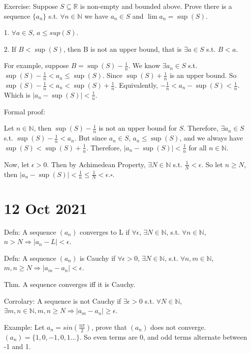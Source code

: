 \documentclass{report}
\begin{document}
Exercise: Suppose $S \subseteq \mathbb{R}$ is non-empty and bounded above. Prove there is a sequence $\{a_n\}$ s.t. $\forall n \in \mathbb{N}$ we have $a_n \in S$ and $\lim a_n =\sup(S)$. 

1. $\forall a \in S$, $a \leq sup(S)$. 

2. If $B < \sup(S)$, then B is not an upper bound, that is $\exists a \in S$ s.t. $B < a$. 

For example, suppose $B = \sup(S) - \frac{1}{n}$. 
We know $\exists a_n \in S$ s.t. $\sup(S) - \frac{1}{n} < a_n \leq \sup(S)$. 
Since $\sup(S) + \frac{1}{n}$ is an upper bound. 
So $\sup(S) - \frac{1}{n} < a_n < \sup(S) + \frac{1}{n}$.
Equivalently, $-\frac{1}{n} < a_n - \sup(S) < \frac{1}{n}$. 
Which is $\left|a_n - \sup(S)\right| < \frac{1}{n}$. 

Formal proof: 

Let $n \in \mathbb{N}$, then $\sup(S) - \frac{1}{n}$ is not an upper bound for $S$. 
Therefore, $\exists a_n \in S$ s.t. $\sup(S) - \frac{1}{n} < a_n$. But since $a_n \in S$, $a_n \leq \sup(S)$, 
and we always have $\sup(S) < \sup(S) + \frac{1}{n}$. 
Therefore, $\left|a_n - \sup(S)\right| < \frac{1}{n}$ for all $n \in \mathbb{N}$. 

Now, let $\epsilon > 0$. Then by Achimedean Property, $\exists N \in \mathbb{N}$ s.t. $\frac{1}{N}< \epsilon$.
So let $n \geq N$, then $\left|a_n - \sup(S)\right| < \frac{1}{n} \leq \frac{1}{N} < \epsilon$.$\square$. 

\section*{12 Oct 2021}

Defn: A sequence $(a_n)$ converges to L if $\forall \epsilon$, $\exists N \in \mathbb{N}$, s.t. $\forall n \in \mathbb{N}$, $n > N \Rightarrow \left|a_n - L\right| < \epsilon$. 

Defn: A sequence $(a_n)$ is Cauchy if $\forall \epsilon > 0$, $\exists N \in \mathbb{N}$, s.t. $\forall n, m \in \mathbb{N}$, $m, n \geq N \Rightarrow \left|a_m - a_n\right| < \epsilon$. 

Thm. A sequence converges iff it is Cauchy. 

Corrolary: A sequence is not Cauchy if $\exists \epsilon > 0$ s.t. $\forall N \in \mathbb{N}$, $\exists m, n \in \mathbb{N}, m,n \geq N \Rightarrow \left|a_m - a_n\right| \geq \epsilon$. 

Example: Let $a_n = sin(\frac{n\pi}{2})$, prove that $(a_n)$ does not converge. $(a_n) = \{1, 0, -1, 0, 1 ...\}$. So even terms are 0, and odd terms alternate between -1 and 1. 
\end{document}
